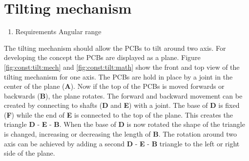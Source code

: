 \section{Tilting mechanism}

\begin{enumerate}
  \item Requirements
  \subitem Angular range
\end{enumerate}


The tilting mechanism should allow the PCBs to tilt around two axis. For developing the concept the PCBs are displayed as a plane. Figure \ref{fig:const:tilt:mech} and \ref{fig:const:tilt:math} show the front and top view of the tilting mechanism for one axis.\p
%
The PCBs are hold in place by a joint in the center of the plane (\textbf{A}). Now if the top of the PCBs is moved forwards or backwards (\textbf{B}), the plane rotates. The forward and backward movement can be created by connecting to shafts (\textbf{D} and \textbf{E}) with a joint. The base of \textbf{D} is fixed (\textbf{F}) while the end of \textbf{E} is connected to the top of the plane. This creates the triangle \textbf{D} - \textbf{E} - \textbf{B}. When the base of \textbf{D} is now rotated the shape of the triangle is changed, increasing or decreasing the length of \textbf{B}.
The rotation around two axis can be achieved by adding a second \textbf{D} - \textbf{E} - \textbf{B} triangle to the left or right side of the plane.
%
